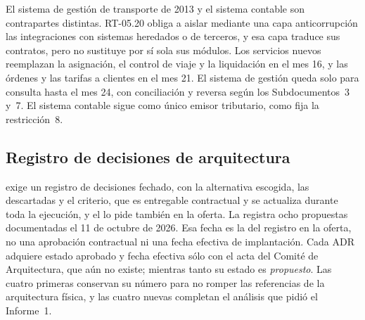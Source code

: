 El sistema de gestión de transporte de 2013  y el sistema contable
 son contrapartes distintas. RT-05.20 obliga a aislar mediante una capa
anticorrupción las integraciones con sistemas heredados o de terceros, y esa capa traduce sus
contratos, pero no sustituye por sí sola sus módulos. Los servicios nuevos reemplazan la asignación, el
control de viaje y la liquidación en el mes 16, y las órdenes y las tarifas a clientes en el mes 21. El
sistema de gestión queda solo para consulta hasta el mes 24, con conciliación y reversa según los
Subdocumentos~3 y~7. El sistema contable sigue como único emisor tributario, como fija la
restricción~8.

\subsection{Registro de decisiones de arquitectura}\label{sec:4-adr}

 exige un registro de decisiones fechado, con la alternativa escogida, las
descartadas y el criterio, que es entregable contractual y se actualiza durante toda la ejecución, y el
 lo pide también en la oferta. La  registra ocho propuestas documentadas el 11 de octubre
de 2026. Esa fecha es la del registro en la oferta, no una aprobación contractual ni una fecha efectiva de implantación. Cada ADR adquiere estado aprobado y fecha efectiva sólo con el acta del Comité de Arquitectura, que aún no existe; mientras tanto su estado es \emph{propuesto}. Las cuatro primeras conservan su número para no romper las referencias de la arquitectura
física, y las cuatro nuevas completan el análisis que pidió el Informe~1.

